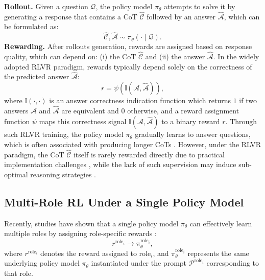 \textbf{Rollout.}
Given a question $\mathcal{Q}$, the policy model $\pi_{\theta}$ attempts to solve it by generating a response that contains a CoT $\hat{\mathcal{C}}$ followed by an answer $\hat{\mathcal{A}}$, which can be formulated as:
\begin{equation}
\hat{\mathcal{C}}, \hat{\mathcal{A}} \sim \pi_{\theta}(\cdot \mid\mathcal{Q}).
\end{equation}
\textbf{Rewarding.}
After rollouts generation, rewards are assigned based on response quality, which can depend on: (i) the CoT $\hat{\mathcal{C}}$ and (ii) the answer $\hat{\mathcal{A}}$.
In the widely adopted RLVR paradigm, rewards typically depend solely on the correctness of the predicted answer $\hat{\mathcal{A}}$:
\begin{equation}\label{eq:outcome_reward}
r = \psi( \mathbb{I}(\mathcal{A},\hat{\mathcal{A}})),
\end{equation}
where $\mathbb{I}(\cdot,\cdot)$ is an answer correctness indication function which returns $1$ if two answers $\mathcal{A}$ and $\hat{\mathcal{A}}$ are equivalent and $0$ otherwise, and a reward assignment function $\psi$ maps this correctness signal $\mathbb{I}(\mathcal{A},\hat{\mathcal{A}})$ to a binary reward $r$.
Through such RLVR training, the policy model $\pi_\theta$ gradually learns to answer questions, which is often associated with producing longer CoTs \cite{Deepseek-R1}.
However, under the RLVR paradigm, the CoT $\hat{\mathcal{C}}$ itself is rarely rewarded directly due to practical implementation challenges \cite{Deepseek-R1}, while the lack of such supervision may induce sub-optimal reasoning strategies \cite{PRM8K}.

\subsection{Multi-Role RL Under a Single Policy Model} \label{sec:pre-masrl}
Recently, studies have shown that a single policy model $\pi_\theta$ can effectively learn multiple roles by assigning role-specific rewards \cite{AbsoluteZero, SPIRAL}:
\begin{equation}\label{eq:reward-role}
r^{\text{role}_i} \rightarrow \pi^{\text{role}_i}_\theta,
\end{equation}
where $r^{\text{role}_i}$ denotes the reward assigned to $\text{role}_i$, and $\pi^{\text{role}_i}_\theta$ represents the same underlying policy model $\pi_\theta$ instantiated under the prompt $\mathcal{P}^{\text{role}_i}$ corresponding to that role.

